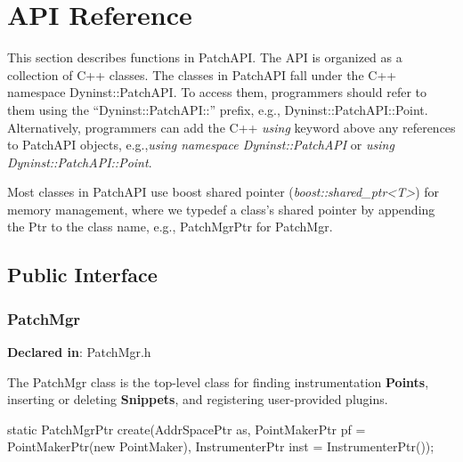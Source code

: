 \section{API Reference}
\label{sec-api}

This section describes functions in PatchAPI. The API is organized as a
collection of C++ classes. The classes in PatchAPI fall under the C++ namespace
Dyninst::PatchAPI. To access them, programmers should refer to them using the
``Dyninst::PatchAPI::'' prefix, e.g., Dyninst::PatchAPI::Point. Alternatively,
programmers can add the C++ \emph{using} keyword above any references to PatchAPI
objects, e.g.,\emph{using namespace Dyninst::PatchAPI} or \emph{using Dyninst::PatchAPI::Point}.

Most classes in PatchAPI use boost shared pointer (\emph{boost::shared\_ptr<T>}) for
memory management, where we typedef a class's shared pointer by appending the
Ptr to the class name, e.g., PatchMgrPtr for PatchMgr.

\subsection{Public Interface}
\label{sec-3.1}

\subsubsection{PatchMgr}
\label{sec-3.1.1}

\textbf{Declared in}: PatchMgr.h

The PatchMgr class is the top-level class for finding instrumentation \textbf{Points},
inserting or deleting \textbf{Snippets}, and registering user-provided plugins.


\begin{apient}
static PatchMgrPtr create(AddrSpacePtr as, PointMakerPtr pf = PointMakerPtr(new PointMaker),
                          InstrumenterPtr inst = InstrumenterPtr());
\end{apient}



